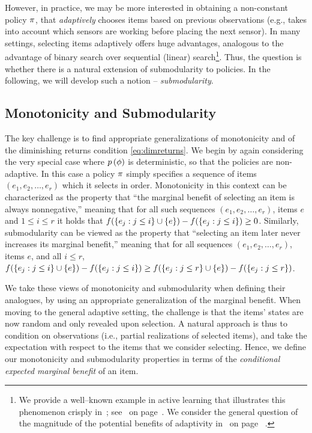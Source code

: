 However, in practice, we may be more interested in obtaining a
non-constant policy $\pi$, that \emph{adaptively} chooses items
based on previous observations (e.g., takes into account which sensors
are working before placing the next sensor).  In many settings,
selecting items adaptively offers huge advantages, analogous to the
advantage of binary search over sequential (linear)
search\footnote{We provide a well--known example in active learning that illustrates this phenomenon
  crisply in~; see~ on
  page~\pageref{sec:active-learning}.  We consider the
  general question of the magnitude of the potential benefits of
  adaptivity in~ on page~\pageref{sec:adaptgap} .}.  
Thus, the question is whether there is a natural extension of submodularity to policies. In the following, we will develop such a notion -- \emph{\term submodularity}. 



\subsection{\Term Monotonicity and Submodularity} 
The key challenge is to find 
appropriate generalizations of monotonicity and 
of the diminishing returns condition
\eqref{eq:dimreturns}.  We begin by again considering the very special
case where ${\color{black}{\ensuremath{p \left( {{\color{black}{\ensuremath{\phi}}}} \right) }}}$ is deterministic, so that the policies are
non-adaptive.  In this case a policy $\pi$ simply specifies a
sequence of items $(e_1, e_2, \ldots, e_r)$ which it selects in order.
Monotonicity in this context can be characterized as the property that
``the marginal benefit of selecting an item is always nonnegative,'' meaning that for all such sequences  $(e_1, e_2, \ldots, e_r)$, items $e$ and $1\leq i \leq r$ it holds that $f(\left\{e_{j}:j\leq i\right\}\cup\{e\})-f(\left\{e_{j}:j\leq i\right\})\geq 0$. 
Similarly, submodularity can be viewed as the property that
``selecting an item later never increases its marginal benefit,''
meaning that for all sequences $(e_1, e_2, \ldots, e_r)$, items
$e$, and all $i \le r$, 
$f(\left\{e_j : j \le i\right\} \cup \left\{e\right\}) - f(\left\{e_j : j \le i\right\}) \ge f(\left\{e_j : j \le r\right\} \cup \left\{e\right\}) - f(\left\{e_j : j \le r\right\}) $.

We take these views of monotonicity and submodularity when defining
their \term analogues, by using an appropriate generalization of the marginal benefit.
When moving to the general adaptive setting, the challenge is that
the items' states are now random and only revealed upon selection. A
natural approach is thus to condition on  observations (i.e., partial
realizations of selected items), and take the expectation with respect to the items that we consider selecting. 
Hence, we define our \term monotonicity and submodularity properties in terms of the
\emph{conditional expected marginal benefit} of an item.
%


